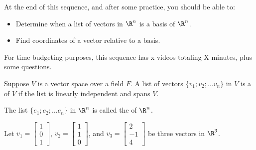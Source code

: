 







At the end of this sequence, and after some practice, you should be able to:

\begin{itemize}
\item Determine when a list of vectors in $\R^n$ is a basis of $\R^n$.    
\item Find coordinates of a vector relative to a basis.  
\end{itemize}


For time budgeting purposes, this sequence has x videos totaling X minutes, 
plus some questions.  




\endedxtext

\endedxvertical








{}  
Suppose $V$ is a vector space over a field $F$.  A list of vectors $\{v_1; v_2; \ldots v_n\}$ in $V$ is a 
{}  
of $V$ if the list is linearly independent and spans $V$.  

{}  
The list $\{e_1; e_2; \ldots e_n\}$ in $\R^n$ is called the {} of $\R^n$.  




\endedxtext

\endedxvertical






Let $v_1 = \left[ \begin{array}{c} 1 \\ 0 \\1 \end{array} \right]$, 
$v_2 = \left[ \begin{array}{c} 1 \\ 1 \\ 0 \end{array} \right]$, and 
$v_3 = \left[ \begin{array}{c} 2 \\ -1 \\ 4 \end{array} \right]$ be three vectors in $\R^3$.  

